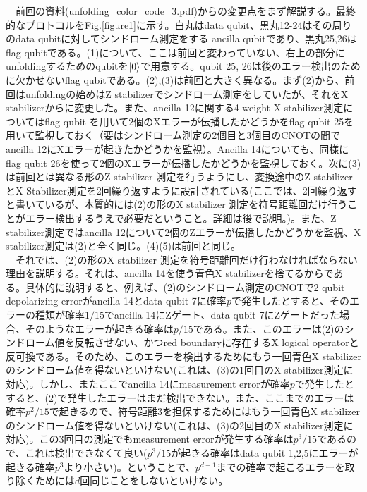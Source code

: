 \documentclass[a4paper,10pt]{ltjsarticle}
\begin{document}
{    　前回の資料(unfolding\_color\_code\_3.pdf)からの変更点をまず解説する。最終的なプロトコルをFig.\ref{figure1}に示す。白丸はdata qubit、黒丸12-24はその周りのdata qubitに対してシンドローム測定をする ancilla qubitであり、黒丸25,26はflag qubitである。(1)について、ここは前回と変わっていない、右上の部分にunfoldingするためのqubitを$\ket{0}$で用意する。qubit 25, 26は後のエラー検出のために欠かせないflag qubitである。(2),(3)は前回と大きく異なる。まず(2)から、前回はunfoldingの始めはZ stabilizerでシンドローム測定をしていたが、それをX stabilizerからに変更した。また、ancilla 12に関する4-weight X stabilizer測定についてはflag qubit を用いて2個のXエラーが伝播したかどうかをflag qubit 25を用いて監視しておく（要はシンドローム測定の2個目と3個目のCNOTの間でancilla 12にXエラーが起きたかどうかを監視）。Ancilla 14についても、同様にflag qubit 26を使って2個のXエラーが伝播したかどうかを監視しておく。次に(3)は前回とは異なる形のZ stabilizer 測定を行うようにし、変換途中のZ stabilizerとX Stabilizer測定を2回繰り返すように設計されている(ここでは、2回繰り返すと書いているが、本質的には(2)の形のX stabilizer 測定を符号距離回だけ行うことがエラー検出するうえで必要だということ。詳細は後で説明。)。また、Z stabilizer測定ではancilla 12について2個のZエラーが伝播したかどうかを監視、X stabilizer測定は(2)と全く同じ。(4)(5)は前回と同じ。\\
    　それでは、(2)の形のX stabilizer 測定を符号距離回だけ行わなければならない理由を説明する。それは、ancilla 14を使う青色X stabilizerを捨てるからである。具体的に説明すると、例えば、(2)のシンドローム測定のCNOTで2 qubit depolarizing errorがancilla 14とdata qubit 7に確率$p$で発生したとすると、そのエラーの種類が確率$1/15$でancilla 14にZゲート、data qubit 7にZゲートだった場合、そのようなエラーが起きる確率は$p/15$である。また、このエラーは(2)のシンドローム値を反転させない、かつred boundaryに存在するX logical operatorと反可換である。そのため、このエラーを検出するためにもう一回青色X stabilizerのシンドローム値を得ないといけない(これは、(3)の1回目のX stabilizer測定に対応)。しかし、またここでancilla 14にmeasurement errorが確率$p$で発生したとすると、(2)で発生したエラーはまだ検出できない。また、ここまでのエラーは確率$p^2/15$で起きるので、符号距離3を担保するためにはもう一回青色X stabilizerのシンドローム値を得ないといけない(これは、(3)の2回目のX stabilizer測定に対応)。この3回目の測定でもmeasurement errorが発生する確率は$p^3/15$であるので、これは検出できなくて良い($p^3/15$が起きる確率はdata qubit 1,2,5にエラーが起きる確率$p^3$より小さい)。ということで、$p^{d-1}$までの確率で起こるエラーを取り除くためには$d$回同じことをしないといけない。\\
}
\end{document}

